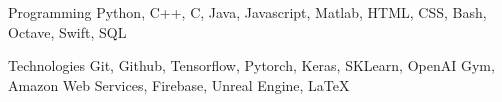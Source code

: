 

\begin{cvskills}

  \cvskill
    {Programming} %
    {Python, C++, C, Java, Javascript, Matlab, HTML, CSS, Bash, Octave, Swift, SQL} %

\cvskill
{Technologies} %
{Git, Github, Tensorflow, Pytorch, Keras, SKLearn, OpenAI Gym, Amazon Web Services, Firebase, Unreal Engine, LaTeX} %


\end{cvskills}
